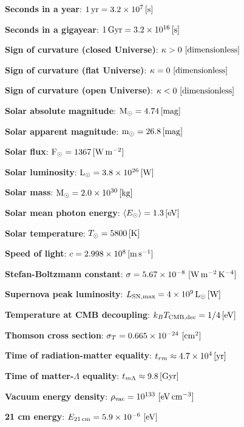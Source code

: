\documentclass[a4paper,11pt]{article}
\begin{document}
{\noindent}\textbf{Seconds in a year}: $1\,{\rm yr} = 3.2\times10^7\,[{\rm s}]$

{\noindent}\textbf{Seconds in a gigayear}: $1\,{\rm Gyr} = 3.2\times10^{16}\,[{\rm s}]$

{\noindent}\textbf{Sign of curvature (closed Universe)}: $\kappa>0 ~ [{\rm dimensionless}]$

{\noindent}\textbf{Sign of curvature (flat Universe)}: $\kappa=0 ~ [{\rm dimensionless}]$

{\noindent}\textbf{Sign of curvature (open Universe)}: $\kappa<0 ~ [{\rm dimensionless}]$

{\noindent}\textbf{Solar absolute magnitude}: ${\rm M}_\odot = 4.74\,[{\rm mag}]$

{\noindent}\textbf{Solar apparent magnitude}: ${\rm m}_\odot = 26.8\,[{\rm mag}]$

{\noindent}\textbf{Solar flux}: ${\rm F}_\odot = 1367\,[{\rm W\,m^{-2}}]$

{\noindent}\textbf{Solar luminosity}: ${\rm L}_\odot = 3.8\times10^{26}\,[{\rm W}]$

{\noindent}\textbf{Solar mass}: ${\rm M}_\odot = 2.0\times10^{30}\,[{\rm kg}]$

{\noindent}\textbf{Solar mean photon energy}: $\langle E_\odot \rangle = 1.3\,[{\rm eV}]$

{\noindent}\textbf{Solar temperature}: $T_\odot = 5800\,[{\rm K}]$

{\noindent}\textbf{Speed of light}: $c=2.998\times10^8\,[{\rm m\,s^{-1}}]$

{\noindent}\textbf{Stefan-Boltzmann constant}: $\sigma=5.67\times10^{-8} ~ [{\rm W\,m^{-2}\,K^{-4}}]$

{\noindent}\textbf{Supernova peak luminosity}: $L_\mathrm{SN,max} = 4\times10^9\,{\rm L_\odot}\,[{\rm W}]$

{\noindent}\textbf{Temperature at CMB decoupling}: $k_BT_\mathrm{CMB,dec} = 1/4\,[{\rm eV}]$

{\noindent}\textbf{Thomson cross section}: $\sigma_T=0.665\times10^{-24} ~ [{\rm cm^2}]$

{\noindent}\textbf{Time of radiation-matter equality}: $t_{rm} \approx 4.7\times10^{4}\,[{\rm yr}]$

{\noindent}\textbf{Time of matter-$\Lambda$ equality}: $t_{m\Lambda}
\approx9.8\,[{\rm Gyr}]$

{\noindent}\textbf{Vacuum energy density}: $\rho_\mathrm{vac} = 10^{133} ~ [{\rm eV\,cm^{-3}}]$

{\noindent}\textbf{21 cm energy}: $E_{21\,\mathrm{cm}} = 5.9\times10^{-6} ~ [{\rm eV}]$
\end{document}
